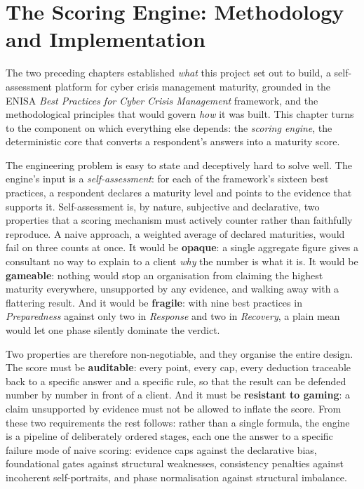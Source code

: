\chapter{The Scoring Engine: Methodology and Implementation}
\label{chap:scoring-engine}

The two preceding chapters established \emph{what} this project set out to
build, a self-assessment platform for cyber crisis management maturity, grounded
in the ENISA \emph{Best Practices for Cyber Crisis Management} framework, and the
methodological principles that would govern \emph{how} it was built. This chapter
turns to the component on which everything else depends: the \emph{scoring engine},
the deterministic core that converts a respondent's answers into a maturity score.

The engineering problem is easy to state and deceptively hard to solve well. The
engine's input is a \emph{self-assessment}: for each of the framework's sixteen
best practices, a respondent declares a maturity level and points to the evidence
that supports it. Self-assessment is, by nature, subjective and declarative, two
properties that a scoring mechanism must actively counter rather than faithfully
reproduce. A naive approach, a weighted average of declared maturities, would fail
on three counts at once. It would be \textbf{opaque}: a single aggregate figure
gives a consultant no way to explain to a client \emph{why} the number is what it
is. It would be \textbf{gameable}: nothing would stop an organisation from claiming
the highest maturity everywhere, unsupported by any evidence, and walking away with
a flattering result. And it would be \textbf{fragile}: with nine best practices in
\emph{Preparedness} against only two in \emph{Response} and two in \emph{Recovery},
a plain mean would let one phase silently dominate the verdict.

Two properties are therefore non-negotiable, and they organise the entire design.
The score must be \textbf{auditable}: every point, every cap, every deduction
traceable back to a specific answer and a specific rule, so that the result can be
defended number by number in front of a client. And it must be \textbf{resistant to
gaming}: a claim unsupported by evidence must not be allowed to inflate the score.
From these two requirements the rest follows: rather than a single formula, the
engine is a pipeline of deliberately ordered stages, each one the answer to a
specific failure mode of naive scoring: evidence caps against the declarative
bias, foundational gates against structural weaknesses, consistency penalties
against incoherent self-portraits, and phase normalisation against structural
imbalance.


